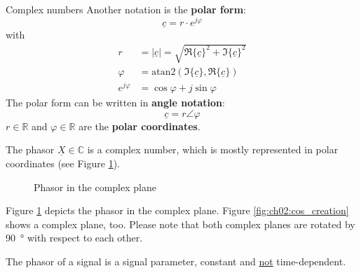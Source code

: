 \begin{refsection}
\begin{excursus}{Complex numbers}
	Another notation is the  \textbf{polar form}:
	\begin{equation}
		\underline{c} = r \cdot e^{j \varphi}
	\end{equation}
	with
	\begin{subequations}
		\begin{align}
			r &= |\underline{c}| = \sqrt{\Re\{\underline{c}\}^2 + \Im\{\underline{c}\}^2} \\
			\varphi &= \mathrm{atan2} \left(\Im\{\underline{c}\}, \Re\{\underline{c}\}\right) \\
			e^{j \varphi} &= \cos \varphi + j \sin \varphi
		\end{align}
	\end{subequations}
	The polar form can be written in  \textbf{angle notation}:
	\begin{equation}
		\underline{c} = r \angle \varphi
	\end{equation}
	$r \in \mathbb{R}$ and $\varphi \in \mathbb{R}$ are the  \textbf{polar coordinates}.
\end{excursus}

The phasor $\underline{X} \in \mathbb{C}$ is a complex number, which is mostly represented in polar coordinates (see Figure \ref{fig:ch02:cmplxplane_phasor}).

\begin{figure}[H]
	\centering
	\caption{Phasor in the complex plane}
	\label{fig:ch02:cmplxplane_phasor}
\end{figure}

Figure \ref{fig:ch02:cmplxplane_phasor} depicts the phasor in the complex plane. Figure \ref{fig:ch02:cos_creation} shows a complex plane, too. Please note that both complex planes are rotated by \SI{90}{\degree} with respect to each other.

\begin{fact}
	The phasor of a signal is a signal parameter, constant and \underline{not} time-dependent.
\end{fact}


\end{refsection}

